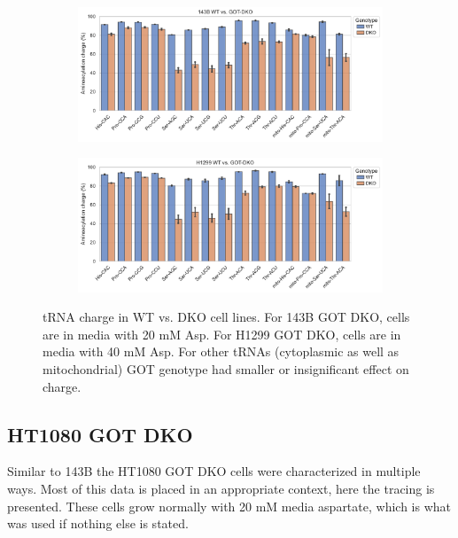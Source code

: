 \begin{figure}[!ht]
     \centering
     \begin{subfigure}[b]{0.8\textwidth}
         \includegraphics[width=\textwidth]{figures/sapp/DKO_char/143B-WT-DKO_charge.pdf}
     \end{subfigure}
     \begin{subfigure}[b]{0.8\textwidth}
         \vspace{2pt}
         \includegraphics[width=\textwidth]{figures/sapp/DKO_char/H1299-WT-DKO_charge.pdf}
     \end{subfigure}
     \hfill
        \caption[tRNA charge in WT vs. GOT DKO.]{
        tRNA charge in WT vs. DKO cell lines.
        For 143B GOT DKO, cells are in media with 20 mM Asp.
        For H1299 GOT DKO, cells are in media with 40 mM Asp.
        For other tRNAs (cytoplasmic as well as mitochondrial) GOT genotype had smaller or insignificant effect on charge.
        }
        \label{fig:sapp:tRNA:WT_vs_DKO}
\end{figure}









\FloatBarrier
\subsection{HT1080 GOT DKO}
Similar to 143B the HT1080 GOT DKO cells were characterized in multiple ways.
Most of this data is placed in an appropriate context, here the \hCi{} tracing is presented.
These cells grow normally with 20 mM media aspartate, which is what was used if nothing else is stated.

